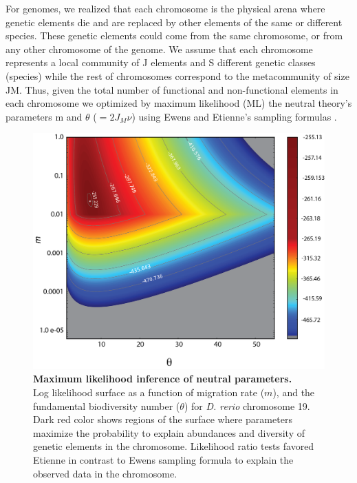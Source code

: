 For genomes, we realized that each chromosome is the physical arena where genetic elements die and are replaced by other elements of the same or different species. These genetic elements could come from the same chromosome, or from any other chromosome of the genome. We assume that each chromosome represents a local community of J elements and S different genetic classes (species) while the rest of chromosomes correspond to the metacommunity of size JM. Thus, given the total number of functional and non-functional elements in each chromosome we optimized by maximum likelihood (ML) the neutral theory's parameters m and $\theta$ ($= 2 J_M\nu$) using Ewens and Etienne's sampling formulas .


\begin{figure}[htpb] 
\centering 
\includegraphics[width=\textwidth]{tex_source/figures/untb_genomes/lnl_chrom.png}
\caption[Maximum likelihood inference of neutral parameters.]{{\bf Maximum likelihood inference of neutral parameters.}\\ Log likelihood surface as a function of migration rate ($m$), and the fundamental biodiversity number ($\theta$) for \textit{D. rerio} chromosome 19. Dark red color shows regions of the surface where parameters maximize the probability to explain abundances and diversity of genetic elements in the chromosome. Likelihood ratio tests favored Etienne in contrast to Ewens sampling formula to explain the observed data in the chromosome.}
\label{fig:lnl_chrom}
\end{figure}


